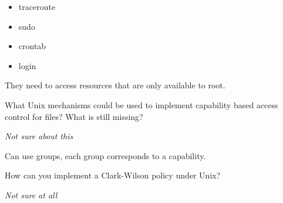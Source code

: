 \documentclass{supervision}
\begin{document}
\begin{questions}
      \begin{solution}
        \begin{itemize}
          \item traceroute
          \item sudo
          \item crontab
          \item login
        \end{itemize}

        They need to access resources that are only available to root.
      \end{solution}

    \question What Unix mechanisms could be used to implement capability based
      access control for files? What is still missing?

      \begin{solution}
        \emph{Not sure about this}

        Can use groups, each group corresponds to a capability.
      \end{solution}

    \question How can you implement a Clark-Wilson policy under Unix?

      \begin{solution}
        \emph{Not sure at all}
      \end{solution}
  \end{questions}
\end{document}
